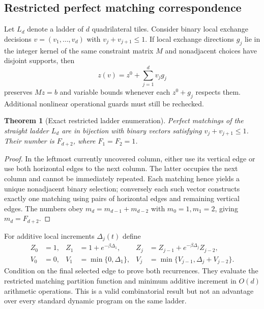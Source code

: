\documentclass[10pt,a4paper]{article}
\newtheorem{theorem}{Theorem}[section]
\theoremstyle{definition}\newtheorem{definition}[theorem]{Definition}
\theoremstyle{remark}\newtheorem{remark}[theorem]{Remark}
\newcommand{\1}{\mathbbm 1}
\begin{document}
\subsection{Restricted perfect matching correspondence}
Let $L_d$ denote a ladder of $d$ quadrilateral tiles. Consider binary local exchange decisions $v=(v_1,\ldots,v_d)$ with $v_j+v_{j+1}\le1$. If local exchange directions $g_j$ lie in the integer kernel of the same constraint matrix $M$ and nonadjacent choices have disjoint supports, then
\begin{equation}z(v)=z^0+\sum_{j=1}^d v_j g_j\end{equation}
preserves $Mz=b$ and variable bounds whenever each $z^0+g_j$ respects them. Additional nonlinear operational guards must still be rechecked.
\begin{theorem}[Exact restricted ladder enumeration]\label{thm:ladder}
Perfect matchings of the straight ladder $L_d$ are in bijection with binary vectors satisfying $v_j+v_{j+1}\le1$. Their number is $F_{d+2}$, where $F_1=F_2=1$.
\end{theorem}
\begin{proof}
In the leftmost currently uncovered column, either use its vertical edge or use both horizontal edges to the next column. The latter occupies the next column and cannot be immediately repeated. Each matching hence yields a unique nonadjacent binary selection; conversely each such vector constructs exactly one matching using pairs of horizontal edges and remaining vertical edges. The numbers obey $m_d=m_{d-1}+m_{d-2}$ with $m_0=1,m_1=2$, giving $m_d=F_{d+2}$.
\end{proof}

For additive local increments $\Delta_j(t)$ define
\begin{equation}\label{eq:snake}\begin{aligned}
Z_0&=1,& Z_1&=1+e^{-\beta\Delta_1},&Z_j&=Z_{j-1}+e^{-\beta\Delta_j}Z_{j-2},\\
V_0&=0,&V_1&=\min\{0,\Delta_1\},&V_j&=\min\{V_{j-1},\Delta_j+V_{j-2}\}.
\end{aligned}\end{equation}
Condition on the final selected edge to prove both recurrences. They evaluate the restricted matching partition function and minimum additive increment in $O(d)$ arithmetic operations. This is a valid combinatorial result but not an advantage over every standard dynamic program on the same ladder.
\end{document}
